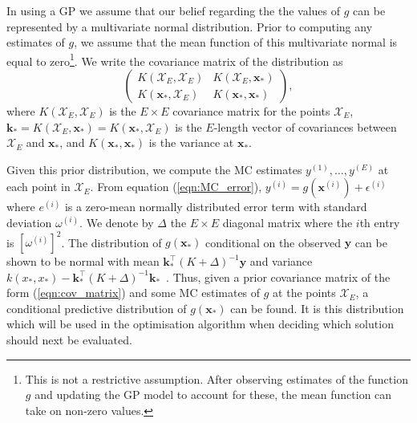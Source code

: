 \documentclass[sagev, Crown]{sagej}
\begin{document}
In using a GP we assume that our belief regarding the the values of $g$ can be represented by a multivariate normal distribution. Prior to computing any estimates of $g$, we assume that the mean function of this multivariate normal is equal to zero\footnote{This is not a restrictive assumption. After observing estimates of the function $g$ and updating the GP model to account for these, the mean function can take on non-zero values.}. We write the covariance matrix of the distribution as
\begin{equation}\label{eqn:cov_matrix}
\begin{pmatrix}
K(\mathcal{X}_{E}, \mathcal{X}_{E}) & K(\mathcal{X}_{E}, \mathbf{x}_{*}) \\
K(\mathbf{x}_{*}, \mathcal{X}_{E}) & K(\mathbf{x}_{*}, \mathbf{x}_{*})
\end{pmatrix},
\end{equation}
where $K(\mathcal{X}_{E}, \mathcal{X}_{E})$ is the $E \times E$ covariance matrix for the points $\mathcal{X}_{E}$, $\mathbf{k}_{*} = K(\mathcal{X}_{E}, \mathbf{x}_{*}) = K(\mathbf{x}_{*}, \mathcal{X}_{E})$ is the $E$-length vector of covariances between $\mathcal{X}_{E}$ and $\mathbf{x}_{*}$, and $K(\mathbf{x}_{*}, \mathbf{x}_{*})$ is the variance at $\mathbf{x}_{*}$.

Given this prior distribution, we compute the MC estimates $y^{(1)} , \ldots , y^{(E)}$ at each point in $\mathcal{X}_{E}$. From equation (\ref{eqn:MC_error}), $y^{(i)} = g(\textbf{x}^{(i)}) + \epsilon^{(i)}$ where $e^{(i)}$ is a zero-mean normally distributed error term with standard deviation $\omega^{(i)}$. We denote by $\Delta$ the $E \times E$ diagonal matrix where the $i$th entry is $[\omega^{(i)}]^{2}$. The distribution of $g(\mathbf{x}_{*})$ conditional on the observed $\mathbf{y}$ can be shown to be normal with mean $\mathbf{k}_{*}^\top(K + \Delta)^{-1}\mathbf{y}$ and variance $k(x_{*}, x_{*})-\mathbf{k}_{*}^\top(K + \Delta)^{-1}\mathbf{k}_{*}$~\cite{Rasmussen2006}. Thus, given a prior covariance matrix of the form (\ref{eqn:cov_matrix}) and some MC estimates of $g$ at the points $\mathcal{X}_{E}$, a conditional predictive distribution of $g(\mathbf{x}_{*})$ can be found. It is this distribution which will be used in the optimisation algorithm when deciding which solution should next be evaluated.
\end{document}
